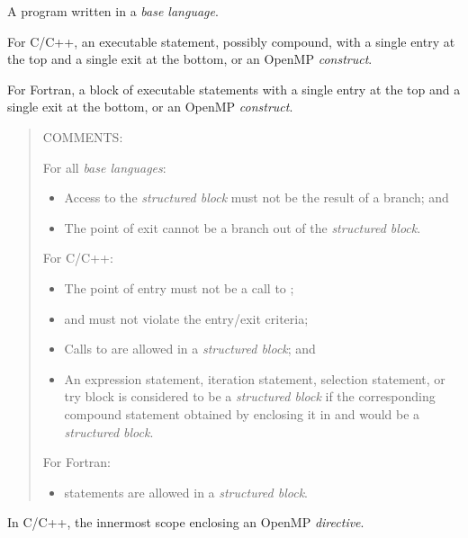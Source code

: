 \glossarydefstart
A program written in a \emph{base language}.
\glossarydefend

\glossarydefstart
For C/C++, an executable statement, possibly compound, with a single entry at the 
top and a single exit at the bottom, or an OpenMP \emph{construct}.

For Fortran, a block of executable statements with a single entry at the top and a 
single exit at the bottom, or an OpenMP \emph{construct}.

\begin{quote}
COMMENTS:

For all \emph{base languages}:

\begin{itemize}
\item Access to the \emph{structured block} must not be the result of a branch; and

\item The point of exit cannot be a branch out of the \emph{structured block}.
\end{itemize}

For C/C++:

\begin{itemize}
\item The point of entry must not be a call to ;

\item {} and  must not violate the entry/exit criteria;

\item Calls to  are allowed in a \emph{structured block}; and

\item An expression statement, iteration statement, selection statement, 
or try block is considered to be a \emph{structured block} if the 
corresponding compound statement obtained by enclosing it in \code{\{} 
and \code{\}} would be a \emph{structured block}.
\end{itemize}

For Fortran:

\begin{itemize}
\item {} statements are allowed in a \emph{structured block}.
\end{itemize}
\end{quote}
\glossarydefend


\glossarydefstart
In C/C++, the innermost scope enclosing an OpenMP \emph{directive}.

